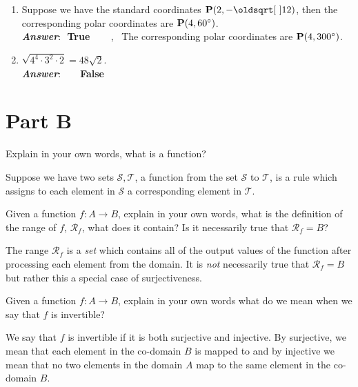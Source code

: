\documentclass[12pt]{article} %
\begin{document}
\begin{qstn}
\begin{enumerate}
    \item Suppose we have the standard coordinates $\vb P\left( 2 , -\sqrt{12}\right) $, then the corresponding polar coordinates
        are $\vb P(4,60^{\circ})$.\\
       \textbf{\emph{Answer}}:\,\, \textbf{True} \,\,\,\,\,\, \, , \,
       The corresponding polar coordinates are $\vb P(4, 300^{\circ})$.

    \item $\sqrt{4^{4}\cdot 3^{2}\cdot 2} = 48\sqrt{2}$. \\
       \textbf{\emph{Answer}}:\,\,  \,\,\,\,\,\, \textbf{False}

  \end{enumerate}
\end{qstn}

\newpage

\section*{Part B}
\begin{qstn}
  Explain in your own words, what is a function?
  \begin{solution}
    Suppose we have two sets $\mathcal{S}, \mathcal{T}$, a function from the set $\mathcal{S}$ to $\mathcal{T}$,
    is a rule which assigns to each element in $\mathcal{S}$ a corresponding element in $\mathcal{T}$.
  \end{solution}
\end{qstn}

\vspace*{2cm}

\begin{qstn}
  Given a function $f \colon A \to B$, explain in your own words, what is the definition of the range of $f$, 
  $\mathcal{R}_f$, what does it contain? Is it necessarily true that $\mathcal{R}_f = B$?
  \begin{solution}
    The range $\mathcal{R}_f$ is a \emph{set} which contains all of the output values of the function after
    processing each element from the domain. It is \emph{not} necessarily true that $\mathcal{R}_f = B$ but rather
    this a special case of surjectiveness.
  \end{solution}
\end{qstn}

\vspace*{2cm}

\begin{qstn}
  Given a function $f \colon A \to B$, explain in your own words what do we mean when we say that $f$ is
  invertible?
  \begin{solution}
    We say that $f$ is invertible if it is both surjective and injective. By surjective, we mean that each element
    in the co-domain $B$ is mapped to and by injective we mean that no two elements in the domain $A$ map to the
    same element in the co-domain $B$.
  \end{solution}
\end{qstn}
\end{document}
